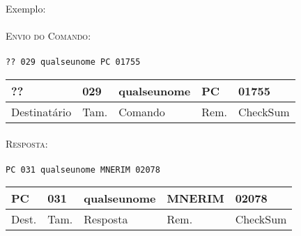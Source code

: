 \documentclass[11pt,	 papera4]{article}
\begin{document}
Exemplo:\\\\ \hspace*{0.5cm} 
\textsc{Envio do Comando:} \\\\ \hspace*{2cm} \texttt{?? 029 qualseunome PC 01755} \\

\begin{table}[h]
	\centering
	\begin{tabular}{p{2cm}p{1cm}p{2cm}p{1cm}p{2cm}}
		\toprule
		?? & 029 & qualseunome & PC & 01755 \\
		\midrule	
		Destinatário & Tam. & Comando & Rem. & CheckSum \\
		\bottomrule
	\end{tabular}
	\label{tab:formatoslatex} %
\end{table}
\paragraph*{\newline\newline}
\hspace*{0.8cm}\textsc{Resposta:} \\\\ \hspace*{2cm}\texttt{PC 031 qualseunome MNERIM 02078} 

\begin{table}[h]
	\centering
	\begin{tabular}{p{1cm}p{1cm}p{2cm}p{2cm}p{2cm}}
		\toprule
		PC & 031 & qualseunome  & MNERIM & 02078 \\
		\midrule	
		Dest. & Tam. & Resposta & Rem. & CheckSum \\
		\bottomrule
	\end{tabular}
	\label{tab:formatoslatex} %
\end{table}





\newpage
\end{document}
